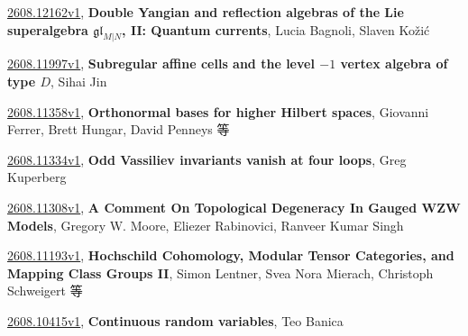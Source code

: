 \documentclass[9pt, a4paper]{article}
\theoremstyle{plain}
\theoremstyle{definition}
\theoremstyle{remark}
\newcommand{\arxiv}[3]{\href{https://arxiv.org/abs/#1}{#1}, \textbf{\textcolor{arxivblue}{#2}}, #3}
\begin{document}
\arxiv{2608.12162v1}{Double Yangian and reflection algebras of the Lie superalgebra $\mathfrak{gl}_{M|N}$, II: Quantum currents}{Lucia Bagnoli, Slaven Kožić}

\arxiv{2608.11997v1}{Subregular affine cells and the level $-1$ vertex algebra of type $D$}{Sihai Jin}

\arxiv{2608.11358v1}{Orthonormal bases for higher Hilbert spaces}{Giovanni Ferrer, Brett Hungar, David Penneys 等}

\arxiv{2608.11334v1}{Odd Vassiliev invariants vanish at four loops}{Greg Kuperberg}

\arxiv{2608.11308v1}{A Comment On Topological Degeneracy In Gauged WZW Models}{Gregory W. Moore, Eliezer Rabinovici, Ranveer Kumar Singh}

\arxiv{2608.11193v1}{Hochschild Cohomology, Modular Tensor Categories, and Mapping Class Groups II}{Simon Lentner, Svea Nora Mierach, Christoph Schweigert 等}

\arxiv{2608.10415v1}{Continuous random variables}{Teo Banica}

\end{document}
